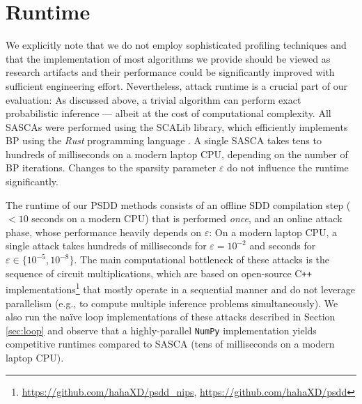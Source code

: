 

\section{Runtime}
\label{sec:runtime}
We explicitly note that we do not employ sophisticated profiling techniques and that the implementation of most algorithms we provide should be viewed as research artifacts and their performance could be significantly improved with sufficient engineering effort. Nevertheless, attack runtime is a crucial part of our evaluation: As discussed above, a trivial algorithm can perform exact probabilistic inference --- albeit at the cost of computational complexity. All SASCAs were performed using the SCALib \cite{scalib} library, which efficiently implements BP using the \emph{Rust} programming language \cite{scalib, rust}. A single SASCA takes tens to hundreds of milliseconds on a modern laptop CPU, depending on the number of BP iterations. Changes to the sparsity parameter $\varepsilon$ do not influence the runtime significantly. 

The runtime of our PSDD methods consists of an offline SDD compilation step ($< 10$ seconds on a modern CPU) that is performed \emph{once}, and an online attack phase, whose performance heavily depends on $\varepsilon$: On a modern laptop CPU, a single attack takes hundreds of milliseconds for $\varepsilon = 10^{-2}$ and seconds for $\varepsilon \in \{ 10^{-5}, 10^{-8} \}$. The main computational bottleneck of these attacks is the sequence of circuit multiplications, which are based on open-source C\texttt{++} implementations\footnote{\url{https://github.com/hahaXD/psdd_nips}, \url{https://github.com/hahaXD/psdd}} that mostly operate in a sequential manner and do not leverage parallelism (e.g., to compute multiple inference problems simultaneously). We also run the na\"ive loop implementations of these attacks described in Section \ref{sec:loop} and observe that a highly-parallel \texttt{NumPy} \cite{numpy} implementation yields competitive runtimes compared to SASCA (tens of milliseconds on a modern laptop CPU).

